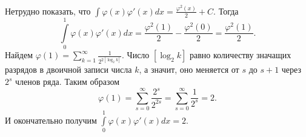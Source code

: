 \documentclass{article}
\begin{document}
Нетрудно показать, что $\int \varphi(x) \varphi'(x) dx = \frac{\varphi^2 (x)}{2} + C$. Тогда $$\int\limits_0^1 \varphi(x) \varphi'(x) dx = \frac{\varphi^2 (1)}{2} - \frac{\varphi^2 (0)}{2} = \frac{\varphi^2 (1)}{2}.$$
Найдем $\varphi(1) = \sum\limits_{k=1}^\infty \frac{1}{2^{2[\log_2 k]}}$. Число $[\log_2 k]$ равно количеству значащих разрядов в двоичной записи числа $k$, а значит, оно меняется от $s$ до $s+1$ через $2^s$ членов ряда. Таким образом
$$\varphi(1) = \sum\limits_{s=0}^\infty \frac{2^s}{2^{2s}} = \sum\limits_{s=0}^\infty \frac{1}{2^s} = 2.$$
И окончательно получим $\int\limits_0^1 \varphi(x) \varphi'(x) dx = 2$.
\end{document}
